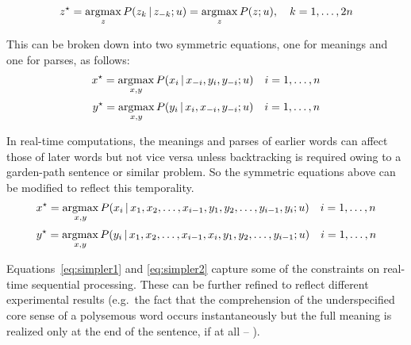 \[ z^\star = \operatorname*{argmax}_{z} P(z_k \,|\, z_{-k}; u) = \operatorname*{argmax}_{z} P(z; u), \quad k = 1, \dots, 2n \]

\noindent This can be broken down into two symmetric equations, one for meanings and one for parses, as follows:
\begin{equation}
x^{\star} = \operatorname*{argmax}_{x,y} P(x_i \,|\, x_{-i}, y_i, y_{-i}; u) \quad i = 1, \dots, n \label{eq:simple1}
\end{equation}
\begin{equation}
y^{\star} = \operatorname*{argmax}_{x,y} P(y_i \,|\, x_i, x_{-i}, y_{-i}; u) \quad i = 1, \dots, n \label{eq:simple2}
\end{equation}

\noindent In real-time computations, the meanings and parses of earlier words can affect those of later words but not vice versa unless backtracking is required owing to a garden-path sentence or similar problem. So the symmetric equations above can be modified to reflect this temporality.
\begin{equation}
x^{\star} = \operatorname*{argmax}_{x,y} P(x_i \,|\, x_1, x_2, \ldots, x_{i-1}, y_1, y_2, \ldots, y_{i-1}, y_i; u) \quad i = 1, \dots, n \label{eq:simpler1}
\end{equation}
\begin{equation}
y^{\star} = \operatorname*{argmax}_{x,y} P(y_i \,|\, x_1, x_2, \ldots, x_{i-1}, x_i, y_1, y_2, \ldots, y_{i-1}; u) \quad i = 1, \dots, n \label{eq:simpler2}
\end{equation}

\noindent Equations~\ref{eq:simpler1} and \ref{eq:simpler2} capture some of the constraints on real-time sequential processing. These can be further refined to reflect different experimental results (e.g.\ the fact that the comprehension of the underspecified core sense of a polysemous word occurs instantaneously but the full meaning is realized only at the end of the sentence, if at all -- \citealt{frisson:sulp}).

